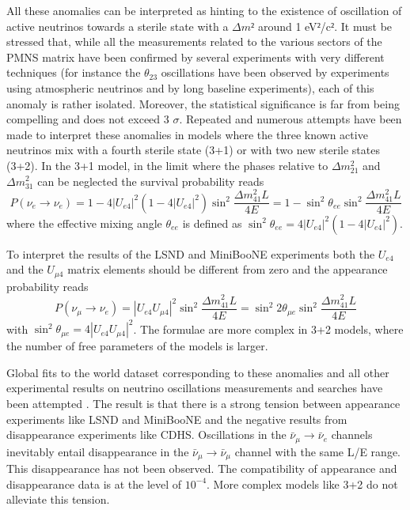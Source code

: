 All these anomalies can be interpreted as hinting to the existence of oscillation of active neutrinos towards a sterile state with a $\Delta m²$ around 1 eV$²$/c$²$. 
It must be stressed that, while all the measurements related to the various sectors of the PMNS matrix have been confirmed by several experiments with very different techniques (for instance the $ \theta_{23}$ oscillations have been observed by experiments using atmospheric neutrinos and by long baseline experiments), each of this anomaly is rather isolated. Moreover, the statistical significance is far from being compelling and does not exceed 3 $\sigma$. 
Repeated and numerous attempts have been made to interpret these anomalies in models where the three known active neutrinos mix with a fourth sterile state (3+1) or with two new sterile states (3+2).
 In the 3+1 model, in the limit where the phases relative to $\Delta m^2_{21}$ and $\Delta m^2_{31}$ can be neglected  the survival probability reads
\begin{equation}
P(\nu_e \rightarrow \nu_e) = 1 - 4 |U_{e4}|^2 (1 - 4 |U_{e4}|^2) \sin^2 \frac{\Delta m^2_{41}L}{4E} = 1 - \sin^2 \theta_{ee} \sin^2 \frac{\Delta m^2_{41}L}{4E}
\end{equation}
where the effective mixing angle $\theta_{ee}$ is defined as $\sin^2 \theta_{ee} = 4 |U_{e4}|^2 (1 - 4 |U_{e4}|^2)$. 

To interpret the results of the LSND and MiniBooNE experiments both the $U_{e4}$ and the $U_{\mu 4}$ matrix elements should be different from zero and the appearance probability reads
\begin{equation}
P(\nu_\mu \rightarrow \nu_e) = |U_{e4} U_{\mu 4}|^2  \sin^2 \frac{\Delta m^2_{41}L}{4E} = \sin^2 2 \theta_{\mu e} \sin^2 \frac{\Delta m^2_{41}L}{4E}
\end{equation}
with $\sin^2 \theta_{\mu e} = 4 |U_{e4} U_{\mu 4}|^2$.
The formulae are more complex in 3+2 models, where the number of free parameters of the models is larger.

Global fits to the world dataset corresponding to these anomalies and all other experimental results on neutrino oscillations measurements and searches have been attempted \cite{giuntirev,kopp}. The result is that there is a strong tension between appearance experiments like LSND and MiniBooNE and the negative results from disappearance experiments like CDHS. Oscillations in the $\bar{\nu}_\mu \rightarrow  \bar{\nu}_e$ channels inevitably entail disappearance in the 
$\bar{\nu}_\mu \rightarrow  \bar{\nu}_\mu$ channel with the same L/E range. This disappearance has not been observed. The compatibility of appearance and disappearance data is at the level of $10^{-4}$. More complex models like 3+2 do not alleviate this tension. 


